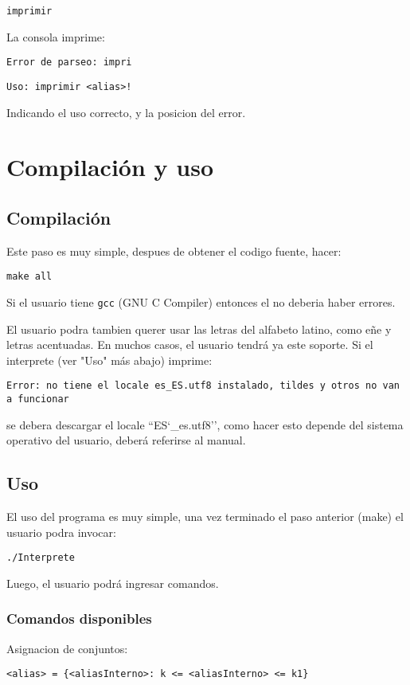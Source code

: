 \documentclass{article}
\begin{document}
	\verb|imprimir|
	
	\noindent La consola imprime:
	
	\verb|Error de parseo: impri|  
	
	\verb|Uso: imprimir <alias>!|
	
	\noindent Indicando el uso correcto, y la posicion del error.
	
	\section*{Compilación y uso}
	
	\subsection*{Compilación}

	Este paso es muy simple, despues de obtener el codigo fuente, hacer:
	
	\verb|make all|
	
	\noindent Si el usuario tiene \verb|gcc| (GNU C Compiler) entonces el no deberia haber errores. 
	
	El usuario podra tambien querer usar las letras del alfabeto latino, como eñe y letras acentuadas. En muchos casos, el usuario tendrá ya este soporte. Si el interprete (ver "Uso" más abajo) imprime:
	
	\verb|Error: no tiene el locale es_ES.utf8 instalado, tildes y otros no van a funcionar|
	
	\noindent se debera descargar el locale ``ES\char`_es.utf8'', como hacer esto depende del sistema operativo del usuario, deberá referirse al manual.

	\subsection*{Uso}
	
	El uso del programa es muy simple, una vez terminado el paso anterior (make) el usuario podra invocar:
	
	\verb|./Interprete|
	
	\noindent Luego, el usuario podrá ingresar comandos.
	
	\subsubsection*{Comandos disponibles}
	
	\noindent Asignacion de conjuntos:
	
	\verb|<alias> = {<aliasInterno>: k <= <aliasInterno> <= k1}|
	
\end{document}
